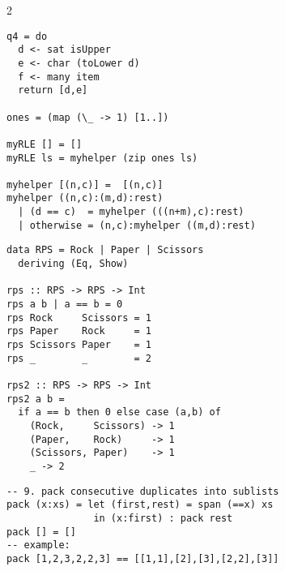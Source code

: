 \documentclass{article}
\def \columncount {2}
\begin{document}
\begin{multicols}{\columncount}
\begin{outline}[longenum]
\begin{verbatim}
q4 = do 
  d <- sat isUpper
  e <- char (toLower d)
  f <- many item
  return [d,e]

ones = (map (\_ -> 1) [1..])

myRLE [] = []
myRLE ls = myhelper (zip ones ls)

myhelper [(n,c)] =  [(n,c)] 
myhelper ((n,c):(m,d):rest)
  | (d == c)  = myhelper (((n+m),c):rest)
  | otherwise = (n,c):myhelper ((m,d):rest)
\end{verbatim}

\begin{verbatim}
data RPS = Rock | Paper | Scissors
  deriving (Eq, Show)

rps :: RPS -> RPS -> Int
rps a b | a == b = 0
rps Rock     Scissors = 1
rps Paper    Rock     = 1
rps Scissors Paper    = 1
rps _        _        = 2

rps2 :: RPS -> RPS -> Int
rps2 a b =
  if a == b then 0 else case (a,b) of
    (Rock,     Scissors) -> 1
    (Paper,    Rock)     -> 1
    (Scissors, Paper)    -> 1
    _ -> 2

\end{verbatim}

\begin{verbatim}
-- 9. pack consecutive duplicates into sublists
pack (x:xs) = let (first,rest) = span (==x) xs
               in (x:first) : pack rest
pack [] = []
-- example:
pack [1,2,3,2,2,3] == [[1,1],[2],[3],[2,2],[3]]
\end{verbatim}







\end{outline}
\end{multicols}
\end{document}
